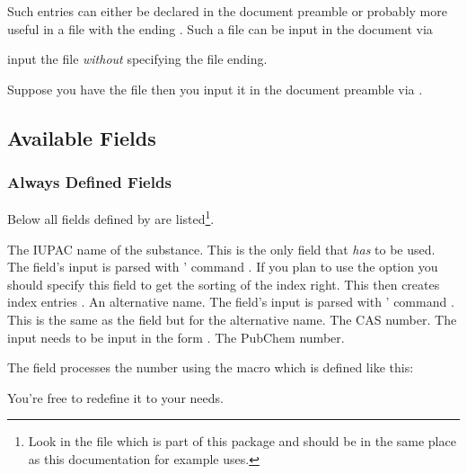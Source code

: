 \documentclass[DIV10,toc=index,toc=bib]{cnpkgdoc}
\begin{document}
Such entries can either be declared in the document preamble or probably
more useful in a file with the ending . Such a file can be input in
the document via
\begin{beschreibung}
  input the file \emph{without} specifying
   the file ending.
\end{beschreibung}
Suppose you have the file  then you input it in the
document preamble via .

\subsection{Available Fields}
\subsubsection{Always Defined Fields}
Below all fields defined by \substances are listed\footnote{Look in the file
 which is part of this package and
should be in the same place as this documentation for example uses.}.
\begin{beschreibung}
 \required The \acs{IUPAC} name of the substance. This is the only
   field that \emph{has} to be used. The field's input is parsed with
   ' command .
 \optional If you plan to use the  option you
   should specify this field to get the sorting of the index right. This then
   creates index entries \makeatletter{}\makeatother.
 \optional An alternative name. The field's input is parsed with
   ' command .
 \optional This is the same as the  field but for the
   alternative name.
 \optional The \ac{CAS} number. The input needs to be input in the
   form .
 \optional The PubChem number.
\end{beschreibung}

The  field processes the number using the macro 
which is defined like this:
\begin{beispiel}
 \def\@CAS#1-#2-#3{\iupac{#1\-#2\-#3}}
 \NewDocumentCommand{}
\end{beispiel}
You're free to redefine it to your needs.
\end{document}
